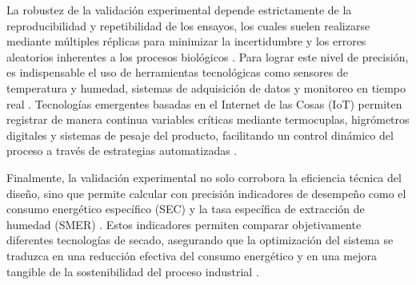 La robustez de la validación experimental depende estrictamente de la reproducibilidad y repetibilidad de los ensayos, los cuales suelen realizarse mediante múltiples réplicas para minimizar la incertidumbre y los errores aleatorios inherentes a los procesos biológicos \parencite{cruz-ospina_improving_2026, abbaspour-gilandeh_effect_2021, cansee_effect_2026, du_design_2025, liu_optimization_2025}. Para lograr este nivel de precisión, es indispensable el uso de herramientas tecnológicas como sensores de temperatura y humedad, sistemas de adquisición de datos y monitoreo en tiempo real \parencite{ambarita_design_2020, el-mesery_application_2025-1, geng_thermodynamically_2023, pramono_low_2022, yu_current_2025}. Tecnologías emergentes basadas en el Internet de las Cosas (IoT) permiten registrar de manera continua variables críticas mediante termocuplas, higrómetros digitales y sistemas de pesaje del producto, facilitando un control dinámico del proceso a través de estrategias automatizadas \parencite{pramono_low_2022, arifin_controlling_2024, cruz-ospina_improving_2026, yu_current_2025}. 

Finalmente, la validación experimental no solo corrobora la eficiencia técnica del diseño, sino que permite calcular con precisión indicadores de desempeño como el consumo energético específico (SEC) y la tasa específica de extracción de humedad (SMER) \parencite{cruz-ospina_improving_2026, burdo_energy-efficient_2025, cansee_effect_2026, gomez-daza_innovacion_2023}. Estos indicadores permiten comparar objetivamente diferentes tecnologías de secado, asegurando que la optimización del sistema se traduzca en una reducción efectiva del consumo energético y en una mejora tangible de la sostenibilidad del proceso industrial \parencite{cansee_effect_2026, cruz-ospina_improving_2026, gomez-daza_innovacion_2023, guemouni_convective_2022}.